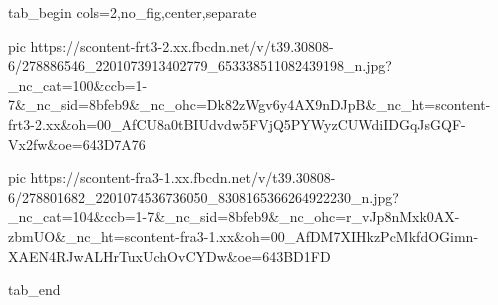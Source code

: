  
 
 
 
 


\ifcmt
  tab_begin cols=2,no_fig,center,separate

     pic https://scontent-frt3-2.xx.fbcdn.net/v/t39.30808-6/278886546_2201073913402779_653338511082439198_n.jpg?_nc_cat=100&ccb=1-7&_nc_sid=8bfeb9&_nc_ohc=Dk82zWgv6y4AX9nDJpB&_nc_ht=scontent-frt3-2.xx&oh=00_AfCU8a0tBIUdvdw5FVjQ5PYWyzCUWdiIDGqJsGQF-Vx2fw&oe=643D7A76

     pic https://scontent-fra3-1.xx.fbcdn.net/v/t39.30808-6/278801682_2201074536736050_8308165366264922230_n.jpg?_nc_cat=104&ccb=1-7&_nc_sid=8bfeb9&_nc_ohc=r_vJp8nMxk0AX-zbmUO&_nc_ht=scontent-fra3-1.xx&oh=00_AfDM7XIHkzPcMkfdOGimn-XAEN4RJwALHrTuxUchOvCYDw&oe=643BD1FD

  tab_end
\fi
